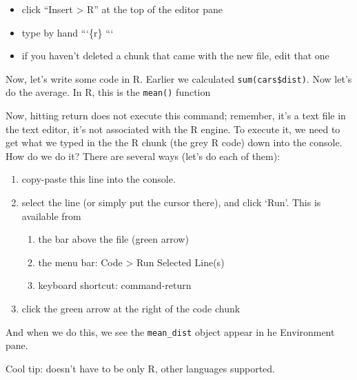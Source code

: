 \documentclass[]{book}
\newenvironment{Shaded}{\begin{snugshade}}{\end{snugshade}}
\newcommand{\KeywordTok}[1]{\textcolor[rgb]{0.13,0.29,0.53}{\textbf{#1}}}
\newcommand{\NormalTok}[1]{#1}
\newcommand{\OperatorTok}[1]{\textcolor[rgb]{0.81,0.36,0.00}{\textbf{#1}}}
\newcommand{\StringTok}[1]{\textcolor[rgb]{0.31,0.60,0.02}{#1}}
\providecommand{\tightlist}{%
  \setlength{\itemsep}{0pt}\setlength{\parskip}{0pt}}
\begin{document}
\begin{itemize}
\tightlist
\item
  click ``Insert \textgreater{} R'' at the top of the editor pane
\item
  type by hand
  ```\{r\}
  ```
\item
  if you haven't deleted a chunk that came with the new file, edit that one
\end{itemize}

Now, let's write some code in R. Earlier we calculated \texttt{sum(cars\$dist)}. Now let's do the average. In R, this is the \texttt{mean()} function

\begin{Shaded}
\end{Shaded}

Now, hitting return does not execute this command; remember, it's a text file in the text editor, it's not associated with the R engine. To execute it, we need to get what we typed in the the R chunk (the grey R code) down into the console. How do we do it? There are several ways (let's do each of them):

\begin{enumerate}
\def\labelenumi{\arabic{enumi}.}
\tightlist
\item
  copy-paste this line into the console.
\item
  select the line (or simply put the cursor there), and click `Run'. This is available from

  \begin{enumerate}
  \def\labelenumii{\alph{enumii}.}
  \tightlist
  \item
    the bar above the file (green arrow)
  \item
    the menu bar: Code \textgreater{} Run Selected Line(s)
  \item
    keyboard shortcut: command-return
  \end{enumerate}
\item
  click the green arrow at the right of the code chunk
\end{enumerate}

And when we do this, we see the \texttt{mean\_dist} object appear in he Environment pane.

Cool tip: doesn't have to be only R, other languages supported.
\end{document}
